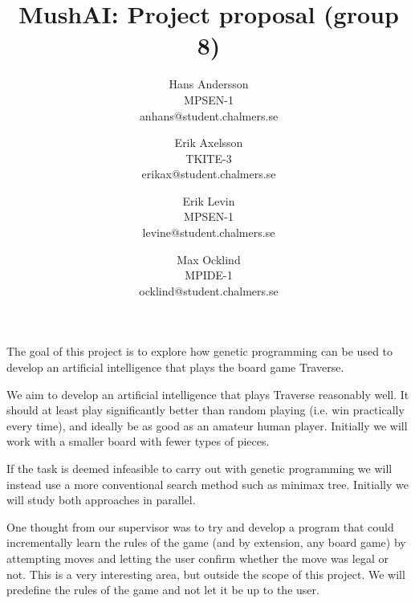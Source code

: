 \documentclass[times, 10pt,twocolumn]{article}
\begin{document}
\title{MushAI: Project proposal (group 8)}

\author{Hans Andersson\\
MPSEN-1\\anhans@student.chalmers.se\\
\and
Erik Axelsson\\
TKITE-3\\
erikax@student.chalmers.se\\
\and
Erik Levin\\
MPSEN-1\\
levine@student.chalmers.se
\and
Max Ocklind\\
MPIDE-1\\
ocklind@student.chalmers.se
}

\maketitle
\thispagestyle{empty}



The goal of this project is to explore how genetic programming can be used to develop an artificial intelligence that plays the board game Traverse.



We aim to develop an artificial intelligence that plays Traverse reasonably well. It should at least play significantly better than random playing (i.e. win practically every time), and ideally be as good as an amateur human player. Initially we will work with a smaller board with fewer types of pieces.

If the task is deemed infeasible to carry out with genetic programming we will instead use a more conventional search method such as minimax tree. Initially we will study both approaches in parallel.


One thought from our supervisor was to try and develop a program that could incrementally learn the rules of the game (and by extension, any board game) by attempting moves and letting the user confirm whether the move was legal or not. This is a very interesting area, but outside the scope of this project. We will predefine the rules of the game and not let it be up to the user.
\end{document}
